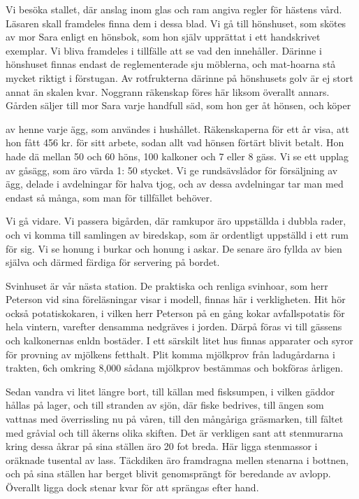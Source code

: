 Vi besöka stallet, där anslag inom glas och ram angiva
regler för hästens vård. Läsaren skall framdeles finna dem i
dessa blad. Vi gå till hönshuset, som skötes av mor Sara enligt
en hönsbok, som hon själv upprättat i ett handskrivet exemplar.
Vi bliva framdeles i tillfälle att se vad den innehåller. Därinne
i hönshuset finnas endast de reglementerade sju möblerna, och
mat-hoarna stå mycket riktigt i förstugan. Av rotfrukterna därinne
på hönshusets golv är ej stort annat än skalen kvar. Noggrann
räkenskap föres här liksom överallt annars. Gården säljer till
mor Sara varje handfull säd, som hon ger åt hönsen, och köper

av henne varje ägg, som användes i hushållet. Räkenskaperna
för ett år visa, att hon fått 456 kr. för sitt arbete, sodan allt
vad hönsen förtärt blivit betalt. Hon hade dä mellan 50 och 60
höns, 100 kalkoner och 7 eller 8 gäss. Vi se ett upplag av
gåsägg, som äro värda 1: 50 stycket. Vi ge rundsävslådor för
försäljning av ägg, delade i avdelningar för halva tjog, och av
dessa avdelningar tar man med endast så många, som man för
tillfället behöver.

Vi gå vidare. Vi passera bigården, där ramkupor äro
uppställda i dubbla rader, och vi komma till samlingen av biredskap,
som är ordentligt uppställd i ett rum för sig. Vi se honung i
burkar och honung i askar. De senare äro fyllda av bien själva
och därmed färdiga för servering på bordet.

Svinhuset är vår nästa station. De praktiska och renliga
svinhoar, som herr Peterson vid sina föreläsningar visar i modell,
finnas här i verkligheten. Hit hör också potatiskokaren, i vilken
herr Peterson på en gång kokar avfallspotatis för hela vintern,
varefter densamma nedgräves i jorden. Därpå föras vi till gässens
och kalkonernas enldn bostäder. I ett särskilt litet hus finnas
apparater och syror för provning av mjölkens fetthalt. Plit
komma mjölkprov från ladugårdarna i trakten, 6ch omkring 8,000
sådana mjölkprov bestämmas och bokföras årligen.

Sedan vandra vi litet längre bort, till källan med fisksumpen,
i vilken gäddor hållas på lager, och till stranden av sjön, där
fiske bedrives, till ängen som vattnas med överrissling nu på
våren, till den mångåriga gräsmarken, till fältet med gråvial och
till åkerns olika skiften. Det är verkligen sant att stenmurarna
kring dessa åkrar på sina ställen äro 20 fot breda. Här ligga
stenmassor i oräknade tusental av lass. Täckdiken äro framdragna
mellen stenarna i bottnen, och på sina ställen har berget blivit
genomsprängt för beredande av avlopp. Överallt ligga dock stenar
kvar för att sprängas efter hand.

